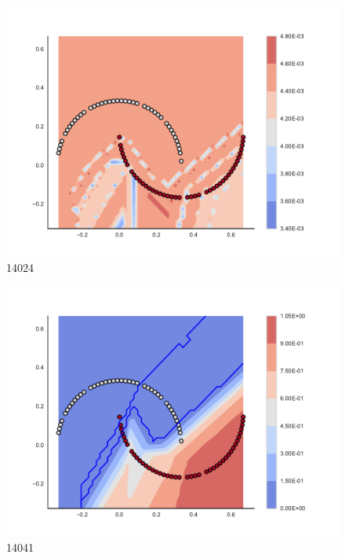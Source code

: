 \begin{subfigure}[b]{0.09\textwidth}
    \includegraphics[clip, trim=2.35cm 1.75cm 4.5cm 0cm,width=\textwidth]{img/convergence/14024.pdf}
    \caption{14024}
    \label{fig:convergence_14024}
\end{subfigure}
%
\begin{subfigure}[b]{0.09\textwidth}
    \includegraphics[clip, trim=2.35cm 1.75cm 4.5cm 0cm,width=\textwidth]{img/convergence/14041.pdf}
    \caption{14041}
    \label{fig:convergence_14041}
\end{subfigure}
%
